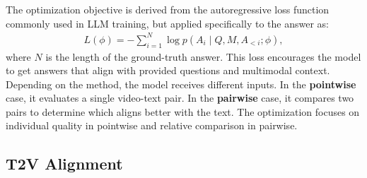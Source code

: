 The optimization objective is derived from the autoregressive loss function commonly used in LLM training, but applied specifically to the answer as:
\vspace{-8pt}
\small
\begin{align}
    L(\phi) = -\sum^N_{i=1} \log p(A_i \mid Q, M, A_{<i}; \phi),
\end{align}
\normalsize
where $N$ is the length of the ground-truth answer. This loss encourages the model to get answers that align with provided questions and multimodal context.
Depending on the method, the model receives different inputs. In the \textbf{pointwise} case, it evaluates a single video-text pair. In the \textbf{pairwise} case, it compares two pairs to determine which aligns better with the text. The optimization focuses on individual quality in pointwise and relative comparison in pairwise.

\subsection{T2V Alignment}

